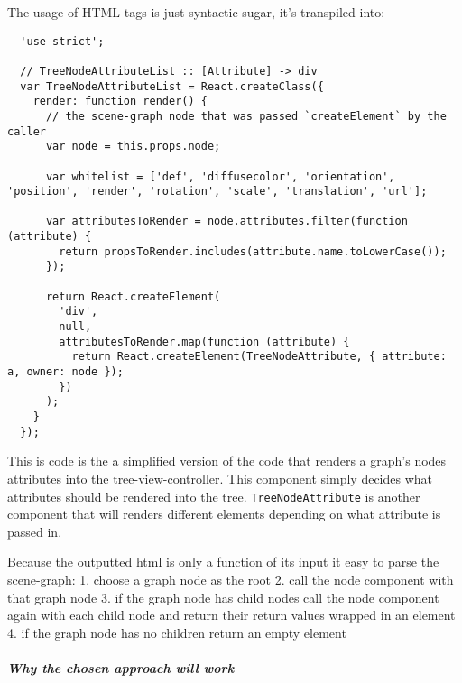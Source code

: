 The usage of HTML tags is just syntactic sugar, it's transpiled into:

\begin{verbatim}
  'use strict';

  // TreeNodeAttributeList :: [Attribute] -> div
  var TreeNodeAttributeList = React.createClass({
    render: function render() {
      // the scene-graph node that was passed `createElement` by the caller
      var node = this.props.node;

      var whitelist = ['def', 'diffusecolor', 'orientation', 'position', 'render', 'rotation', 'scale', 'translation', 'url'];

      var attributesToRender = node.attributes.filter(function (attribute) {
        return propsToRender.includes(attribute.name.toLowerCase());
      });

      return React.createElement(
        'div',
        null,
        attributesToRender.map(function (attribute) {
          return React.createElement(TreeNodeAttribute, { attribute: a, owner: node });
        })
      );
    }
  });
\end{verbatim}

This is code is the a simplified version of the code that renders a
graph's nodes attributes into the tree-view-controller. This component
simply decides what attributes should be rendered into the tree.
\texttt{TreeNodeAttribute} is another component that will renders
different elements depending on what attribute is passed in.

Because the outputted html is only a function of its input it easy to
parse the scene-graph: 1. choose a graph node as the root 2. call the
node component with that graph node 3. if the graph node has child nodes
call the node component again with each child node and return their
return values wrapped in an element 4. if the graph node has no children
return an empty element

\subparagraph{Why the chosen approach will
work}\label{why-the-chosen-approach-will-work}


